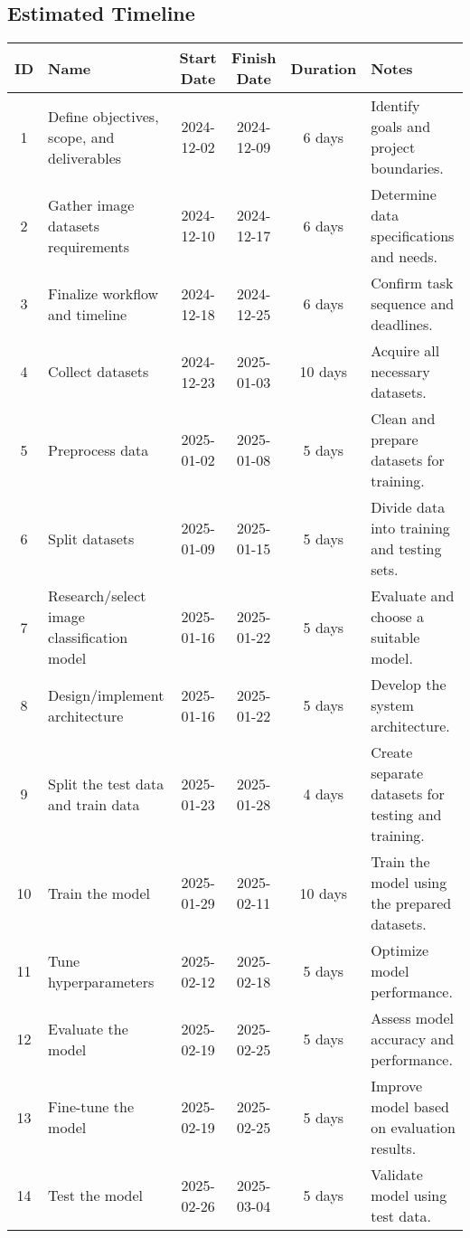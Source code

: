 \subsection{Estimated Timeline}
\begin{longtable}{|c|p{4cm}|c|c|c|p{4cm}|}
\hline
\textbf{ID} & \textbf{Name} & \textbf{Start Date} & \textbf{Finish Date} & \textbf{Duration} & \textbf{Notes} \\ \hline
1 & Define objectives, scope, and deliverables & 2024-12-02 & 2024-12-09 & 6 days & Identify goals and project boundaries. \\ \hline
2 & Gather image datasets requirements & 2024-12-10 & 2024-12-17 & 6 days & Determine data specifications and needs. \\ \hline
3 & Finalize workflow and timeline & 2024-12-18 & 2024-12-25 & 6 days & Confirm task sequence and deadlines. \\ \hline
4 & Collect datasets & 2024-12-23 & 2025-01-03 & 10 days & Acquire all necessary datasets. \\ \hline
5 & Preprocess data & 2025-01-02 & 2025-01-08 & 5 days & Clean and prepare datasets for training. \\ \hline
6 & Split datasets & 2025-01-09 & 2025-01-15 & 5 days & Divide data into training and testing sets. \\ \hline
7 & Research/select image classification model & 2025-01-16 & 2025-01-22 & 5 days & Evaluate and choose a suitable model. \\ \hline
8 & Design/implement architecture & 2025-01-16 & 2025-01-22 & 5 days & Develop the system architecture. \\ \hline
9 & Split the test data and train data & 2025-01-23 & 2025-01-28 & 4 days & Create separate datasets for testing and training. \\ \hline
10 & Train the model & 2025-01-29 & 2025-02-11 & 10 days & Train the model using the prepared datasets. \\ \hline
11 & Tune hyperparameters & 2025-02-12 & 2025-02-18 & 5 days & Optimize model performance. \\ \hline
12 & Evaluate the model & 2025-02-19 & 2025-02-25 & 5 days & Assess model accuracy and performance. \\ \hline
13 & Fine-tune the model & 2025-02-19 & 2025-02-25 & 5 days & Improve model based on evaluation results. \\ \hline
14 & Test the model & 2025-02-26 & 2025-03-04 & 5 days & Validate model using test data. \\ \hline

\end{longtable}
